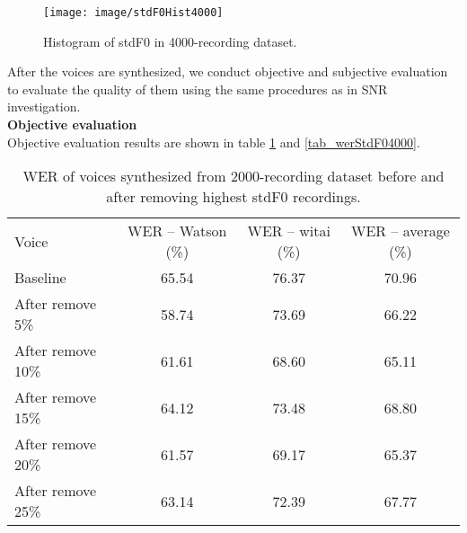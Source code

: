 \documentclass[12pt]{article}
\begin{document}
\begin{figure}[t]
\begin{center}
\texttt{[image: image/stdF0Hist4000]}
\end{center}
\vspace{-0.3cm}
\caption[stdF0 Hist 4000.]{Histogram of stdF0 in 4000-recording dataset.}
\label{fig_stdF0Hist4000}
\end{figure}

After the voices are synthesized, we conduct objective and subjective evaluation to evaluate the quality of them using the same procedures as in SNR investigation.\vspace{0.3cm}\\
\textbf{Objective evaluation}\\
Objective evaluation results are shown in table \ref{tab_werStdF02000} and \ref{tab_werStdF04000}.

\begin{table}[]
\begin{center}
\caption{WER of voices synthesized from 2000-recording dataset before and after removing highest stdF0 recordings.}
\label{tab_werStdF02000}
\vspace{3mm}
\begin{tabular}{lccc}
\hline
Voice & WER – Watson (\%) & WER – witai (\%) & WER – average (\%)\\
\cmidrule(l{0pt}r{2pt}){1-1}\cmidrule(l{0pt}r{2pt}){2-2}\cmidrule(l{0pt}r{2pt}){3-3}\cmidrule(l{0pt}r{2pt}){4-4}
Baseline          & 65.54 & 76.37 & 70.96 \\
After remove 5\%  & 58.74 & 73.69 & 66.22 \\
After remove 10\% & 61.61 & 68.60 & 65.11 \\
After remove 15\% & 64.12 & 73.48 & 68.80 \\
After remove 20\% & 61.57 & 69.17 & 65.37 \\
After remove 25\% & 63.14 & 72.39 & 67.77 \\
\hline
\end{tabular}
\end{center}
\end{table}
\end{document}
